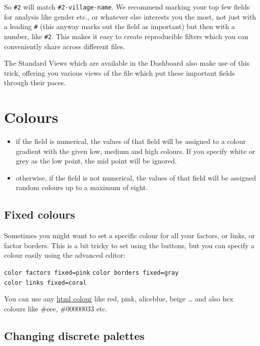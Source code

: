 \documentclass[
]{book}
\providecommand{\tightlist}{%
  \setlength{\itemsep}{0pt}\setlength{\parskip}{0pt}}
\begin{document}
So \texttt{\#2} will match \texttt{\#2-village-name}. We recommend marking your top few fields for analysis like gender etc., or whatever else interests you the most, not just with a leading \texttt{\#} (this anyway marks out the field as important) but then with a number, like \texttt{\#2}. This makes it easy to create reproducible filters which you can conveniently share across different files.

The Standard Views which are available in the Dashboard also make use of this trick, offering you various views of the file which put these important fields through their paces.

\hypertarget{colours}{%
\section{Colours}\label{colours}}

\begin{itemize}
\tightlist
\item
  if the field is numerical, the values of that field will be assigned to a colour gradient with the given low, medium and high colours. If you specify white or grey as the low point, the mid point will be ignored.
\item
  otherwise, if the field is not numerical, the values of that field will be assigned random colours up to a maximum of eight.
\end{itemize}

\hypertarget{xfixed-colours}{%
\subsection{Fixed colours}\label{xfixed-colours}}

Sometimes you might want to set a specific colour for all your factors, or links, or factor borders. This is a bit tricky to set using the buttons, but you can specify a colour easily using the advanced editor:

\texttt{color\ factors\ fixed=pink}
\texttt{color\ borders\ fixed=gray}
\texttt{color\ links\ fixed=coral}

You can use any \href{https://www.w3schools.com/colors/colors_names.asp}{html colour} like red, pink, aliceblue, beige \ldots{} and also hex colours like \#eee, \#00000033 etc.

\hypertarget{xdiscrete-palettes}{%
\subsection{Changing discrete palettes}\label{xdiscrete-palettes}}
\end{document}
